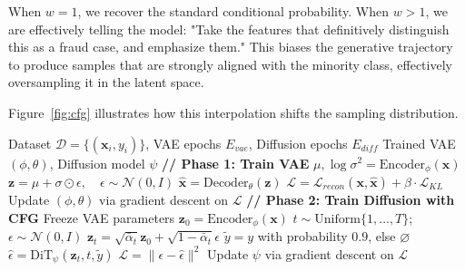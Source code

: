 \documentclass[conference]{IEEEtran}
\begin{document}
When $w = 1$, we recover the standard conditional probability. When $w > 1$, we are effectively telling the model: "Take the features that definitively distinguish this as a fraud case, and emphasize them." This biases the generative trajectory to produce samples that are strongly aligned with the minority class, effectively oversampling it in the latent space.

Figure~\ref{fig:cfg} illustrates how this interpolation shifts the sampling distribution.

\begin{algorithm}
\caption{RE-TabSyn Training}
\begin{algorithmic}[1]
\REQUIRE Dataset $\mathcal{D} = \{(\mathbf{x}_i, y_i)\}$, VAE epochs $E_{vae}$, Diffusion epochs $E_{diff}$
\ENSURE Trained VAE $(\phi, \theta)$, Diffusion model $\psi$
\STATE \textbf{// Phase 1: Train VAE}
        \STATE $\mu, \log \sigma^2 = \mathrm{Encoder}_\phi(\mathbf{x})$
        \STATE $\mathbf{z} = \mu + \sigma \odot \epsilon, \quad \epsilon \sim \mathcal{N}(0, I)$
        \STATE $\hat{\mathbf{x}} = \mathrm{Decoder}_\theta(\mathbf{z})$
        \STATE $\mathcal{L} = \mathcal{L}_{recon}(\mathbf{x}, \hat{\mathbf{x}}) + \beta \cdot \mathcal{L}_{KL}$
        \STATE Update $(\phi, \theta)$ via gradient descent on $\mathcal{L}$
    \ENDFOR
\ENDFOR
\STATE \textbf{// Phase 2: Train Diffusion with CFG}
\STATE Freeze VAE parameters
        \STATE $\mathbf{z}_0 = \mathrm{Encoder}_\phi(\mathbf{x})$
        \STATE $t \sim \mathrm{Uniform}\{1, \dots, T\}$; $\epsilon \sim \mathcal{N}(0, I)$
        \STATE $\mathbf{z}_t = \sqrt{\bar{\alpha}_t}\mathbf{z}_0 + \sqrt{1-\bar{\alpha}_t}\epsilon$
        \STATE $\tilde{y} = y$ with probability $0.9$, else $\varnothing$
        \STATE $\hat{\epsilon} = \mathrm{DiT}_\psi(\mathbf{z}_t, t, \tilde{y})$
        \STATE $\mathcal{L} = \|\epsilon - \hat{\epsilon}\|^2$
        \STATE Update $\psi$ via gradient descent on $\mathcal{L}$
    \ENDFOR
\ENDFOR
\end{algorithmic}
\label{alg:training}
\end{algorithm}
\end{document}
